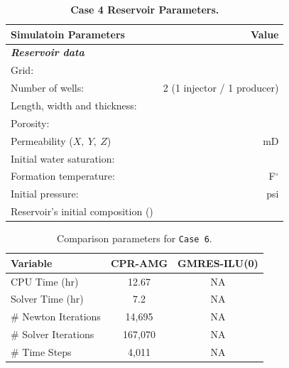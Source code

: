 \FloatBarrier
\begin{center}
\begin{table}[h!]
\begin{adjustbox}{width=0.5\textwidth}
    \begin{threeparttable}
    \caption{\textbf{Case 4 Reservoir Parameters\supercite{phdfernandes}.}}
    \label{viscous}
        \begin{tabular}{l r }
            \toprule
            Simulatoin Parameters & Value\\
            \midrule
	\rowcolor{red!20}\textit{\textbf{Reservoir data}}      & \\
	Grid:      &            \\
	\rowcolor{blue!5}Number of wells:      &  2 (1 injector / 1 producer) \\
	Length, width and thickness:      & \\
	\rowcolor{blue!5}Porosity:       &           \\
	Permeability ($X, \ Y, \ Z$) &  mD\\
	\rowcolor{blue!5}Initial water saturation:    &  \\      
	Formation temperature:    &  F$^{\circ}$     \\
	\rowcolor{blue!5}Initial pressure:    &       psi\\
	Reservoir’s initial composition () & \\
        \bottomrule
        \end{tabular}
    \end{threeparttable}
\end{adjustbox}    
\end{table}
\end{center}
\FloatBarrier

\begin{table}[h!]
   \caption{Comparison parameters for \texttt{Case 6}.}
   \label{case6-tab}
   \small
   \centering
   \begin{tabular}{lcc}
   \toprule\toprule
   \textbf{Variable} & \textbf{CPR-AMG} & \textbf{GMRES-ILU(0)} \\
   \midrule
   CPU Time (hr) & 12.67 &  NA \\
   Solver Time (hr) & 7.2  & NA \\
   \# Newton Iterations & 14,695 & NA\\
   \# Solver Iterations & 167,070 & NA \\
   \# Time Steps & 4,011& NA \\
   \bottomrule
   \end{tabular}
\end{table}

